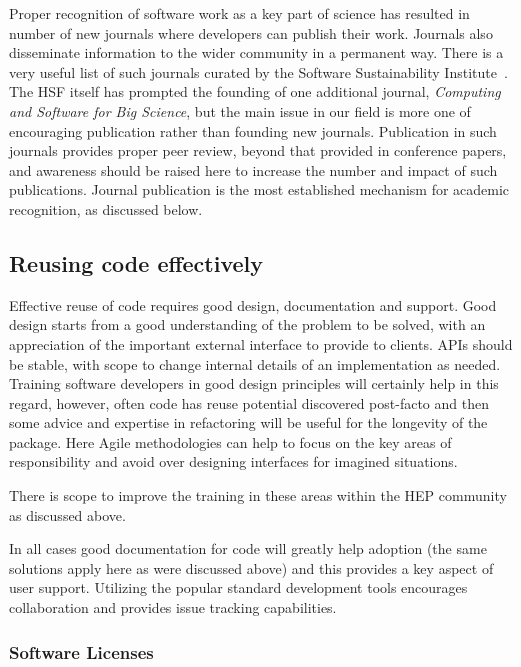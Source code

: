 \documentclass[12pt,a4paper]{article}
\begin{document}
Proper recognition of software work as a key part of science has
resulted in number of new journals where developers can publish their
work. Journals also disseminate information to the wider community in a
permanent way. There is a very useful
list of such journals curated by the Software Sustainability
Institute~\cite{SSI2017}.
The HSF itself has prompted the founding of one additional journal,
\emph{Computing and Software for Big Science}, but the main issue in our
field is more one of encouraging publication rather than founding new
journals. Publication in such journals provides proper peer review,
beyond that provided in conference papers, and awareness should be
raised here to increase the number and impact of such publications.
Journal publication is the most established mechanism for academic
recognition, as discussed below.

\hypertarget{reusing-code-effectively}{%
\subsection{Reusing code effectively}\label{reusing-code-effectively}}

Effective reuse of code requires good design, documentation and support.
Good design starts from a good understanding of the problem to be
solved, with an appreciation of the important external interface to
provide to clients. APIs should be stable, with scope to change internal
details of an implementation as needed. Training software developers in
good design principles will certainly help in this regard, however,
often code has reuse potential discovered post-facto and then some
advice and expertise in refactoring will be useful for the longevity of
the package. Here Agile methodologies can help to focus on the key areas
of responsibility and avoid over designing interfaces for imagined
situations.

There is scope to improve the training in these areas within the HEP
community as discussed above.

In all cases good documentation for code will greatly help adoption (the
same solutions apply here as were discussed above) and this provides a
key aspect of user support. Utilizing the popular standard development
tools encourages collaboration and provides issue tracking capabilities.

\hypertarget{software-licenses}{%
\subsubsection{Software Licenses}\label{software-licenses}}
\end{document}
